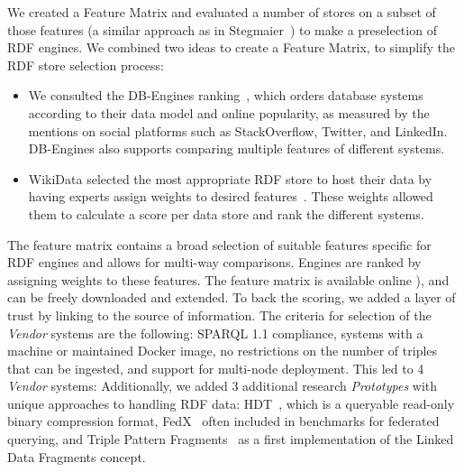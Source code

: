 
We created a Feature Matrix and evaluated a number of stores on a subset of those features (a similar approach as in Stegmaier~\cite{Stegmaier_evaluationof}) to make a preselection of RDF engines.
We combined two ideas to create a Feature Matrix, to simplify the RDF store selection process:
\begin{itemize}
\item We consulted the DB-Engines ranking~\cite{dbengines}, which orders database systems according to their data model and online popularity, as measured by the mentions on social platforms such as StackOverflow, Twitter, and LinkedIn. 
DB-Engines also supports comparing multiple features of different systems.
\item WikiData selected the most appropriate RDF store to host their data by having experts assign weights to desired features~\cite{wikidataranking}.
These weights allowed them to calculate a score per data store and rank the different systems. 
\end{itemize}

The feature matrix contains a broad selection of suitable features specific for RDF engines and allows for multi-way comparisons. Engines are ranked by assigning weights to these features. 
The feature matrix is available online ), and can be freely downloaded and extended. To back the scoring, we added a layer of trust by linking to the source of information.
The criteria for selection of the \emph{Vendor} systems are the following:
SPARQL 1.1 compliance, systems with a machine or maintained Docker image, no restrictions on the number of triples that can be ingested, and support for multi-node deployment.
This led to 4 \emph{Vendor} systems:  
Additionally, we added 3 additional research \emph{Prototypes} with unique approaches to handling RDF data: HDT~\cite{DBLP:journals/ws/FernandezMGPA13}, which is a queryable read-only binary compression format, FedX~\cite{DBLP:conf/semweb/SchwarteHHSS11} often included in benchmarks for federated querying, and Triple Pattern Fragments~\cite{DBLP:conf/semweb/VerborghHMHVSCCMW14} as a first implementation of the Linked Data Fragments concept.


